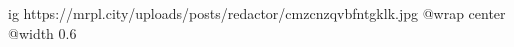  
 
 
 
 

\ifcmt
  ig https://mrpl.city/uploads/posts/redactor/cmzcnzqvbfntgklk.jpg
  @wrap center
  @width 0.6
\fi
